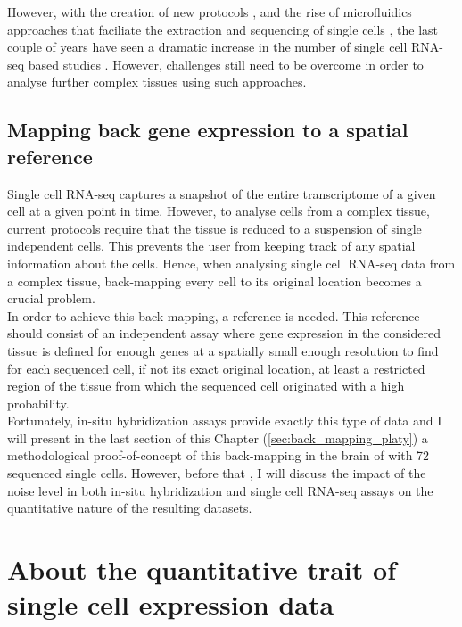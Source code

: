 	However, with the creation of new protocols \cite{ramskold12,tang09}, and the rise of microfluidics approaches that faciliate the extraction and sequencing of single cells \cite{ozsolak10}, the last couple of years have seen a dramatic increase in the number of single cell RNA-seq based studies \cite{islam13,marinov13,yan13,staahlberg13,deng14}. However, challenges still need to be overcome in order to analyse further complex tissues using such approaches.

  \subsection{Mapping back gene expression to a spatial reference}

	Single cell RNA-seq captures a snapshot of the entire transcriptome of a given cell at a given point in time. However, to analyse cells from a complex tissue, current protocols require that the tissue is reduced to a suspension of single independent cells. This prevents the user from keeping track of any spatial information about the cells. Hence, when analysing single cell RNA-seq data from a complex tissue, back-mapping every cell to its original location becomes a crucial problem.\\ 
	
	In order to achieve this back-mapping, a reference is needed. This reference should consist of an independent assay where gene expression in the considered tissue is defined for enough genes at a spatially small enough resolution to find for each sequenced cell, if not its exact original location, at least a restricted region of the tissue from which the sequenced cell originated with a high probability.\\
	
	Fortunately, in-situ hybridization assays provide exactly this type of data and I will present in the last section of this Chapter (\ref{sec:back_mapping_platy}) a methodological proof-of-concept of this back-mapping in the brain of \platy{} with 72 sequenced single cells. However, before that , I will discuss the impact of the noise level in both in-situ hybridization and single cell RNA-seq assays on the quantitative nature of the resulting datasets.

\section{About the quantitative trait of single cell expression data}\label{sec:quantitative_single_cell}
